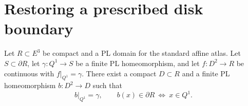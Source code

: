 \section{Restoring a prescribed disk boundary}
\label{sec:dehn-proper-disk}

\begin{theorem}
\label{thm:dehn-standard-proper}
Let $R\subset E^3$ be compact and a PL domain for the standard affine
atlas.  Let $S\subset\partial R$, let $\gamma:Q^1\to S$ be a finite
PL homeomorphism, and let $f:D^2\to R$ be continuous with
$f|_{Q^1}=\gamma$.  There exist a compact $D\subset R$ and a finite
PL homeomorphism $b:D^2\to D$ such that
\[
 b|_{Q^1}=\gamma,\qquad
 b(x)\in\partial R\ \Longleftrightarrow\ x\in Q^1.
\]
\cite[Corollary 3.2, p. 57]{Hatcher3M2014}
\end{theorem}

